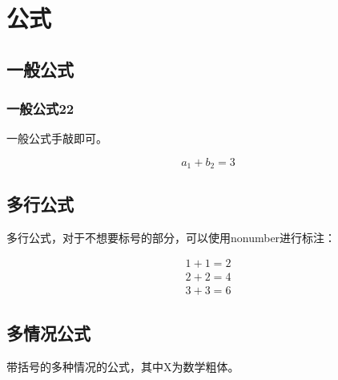 \documentclass[AutoFakeBold]{LZUThesis-PgD&PhD}
\begin{document}
\section{公式}

\subsection{一般公式}
\subsubsection{一般公式22}

一般公式手敲即可。



\begin{equation}\label{eq:sip}
    a_1 + b_2 = 3
\end{equation}


\subsection{多行公式}

多行公式，对于不想要标号的部分，可以使用nonumber进行标注：


\begin{gather}\label{eq:add}
    1+1=2 \\
    2+2=4 \\
    3+3=6 \nonumber
\end{gather}

\subsection{多情况公式}
带括号的多种情况的公式，其中X为数学粗体。

\end{document}

